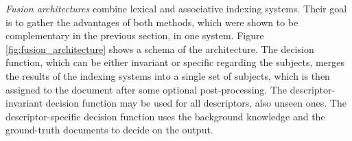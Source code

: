 \textit{Fusion architectures} combine lexical and associative indexing systems. Their goal is to gather the advantages of both methods, which were shown to be complementary in the previous section, in one system. Figure \ref{fig:fusion_architecture} shows a schema of the architecture. The decision function, which can be either invariant or specific regarding the subjects, merges the results of the indexing systems into a single set of subjects, which is then assigned to the document after some optional post-processing. The descriptor-invariant decision function may be used for all descriptors, also unseen ones. The descriptor-specific decision function uses the background knowledge and the ground-truth documents to decide on the output.
